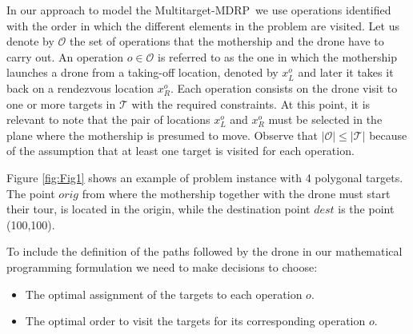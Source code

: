 \documentclass{itor}
\theoremstyle{definition}
\theoremstyle{remark}
\def\AMD{{\sf Multitarget-MDRP\xspace}}
\begin{document}
In our approach to model the \AMD \ we use operations identified with the order in which the different elements in the problem are visited. Let us denote by $\mathcal O$ the set of operations that the mothership and the drone have to carry out. An operation $o\in\mathcal O$ is referred to as the one in which the mothership launches a drone from a taking-off location, denoted by $x_L^o$ and later it takes it back on a rendezvous location $x_R^o$. Each operation consists on the drone visit to one or more targets in $\mathcal T$ with the required constraints. At this point, it is relevant to note that the pair of locations $x_L^o$ and $x_R^o$ must be selected in the plane where the mothership is presumed to move. Observe that $|\mathcal O|\leq|\mathcal T|$ because of the assumption that at least one target is visited for each operation.





     
Figure \ref{fig:Fig1} shows an example of problem instance with 4 polygonal targets. The point $orig$ from where the mothership together with the drone must start their tour, is located in the origin, while the destination point $dest$ is the point (100,100).
    
     


To include the definition of the paths followed by the drone in our mathematical programming formulation we need to make decisions to choose:
\begin{itemize}
    \item The optimal assignment of the targets to each operation $o$.
    \item The optimal order to visit the targets for its corresponding operation $o$.
\end{itemize}

\end{document}
